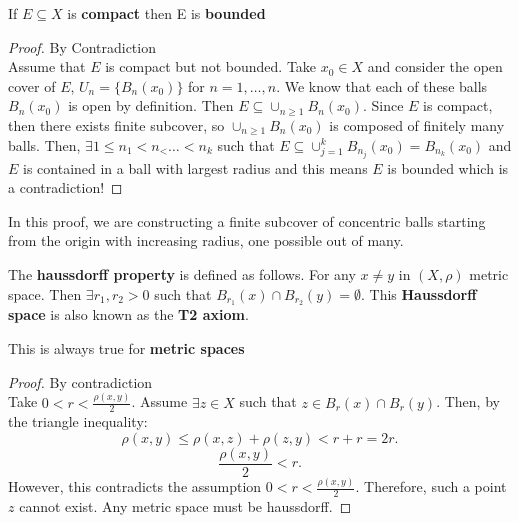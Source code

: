 \documentclass[a4paper]{article}
\begin{document}
\begin{prop}
  If $E \subseteq X$ is \textbf{compact} then E is \textbf{bounded}
  \begin{proof}{By Contradiction}\\
    Assume that $E$ is compact but not bounded.  Take $x_0 \in X$ and consider the open cover of $E$,  $U_n = \{ B_n(x_0) \}$ 
    for $n=1,\ldots,n$. We know that each of these balls $B_n(x_0)$ is open by definition. Then $E \subseteq \cup_{n \geq 1} B_n(x_0)$.
    Since $E$ is compact, then there exists finite subcover, so $\cup_{n \geq 1} B_n(x_0)$ is composed of finitely many balls.
    Then, $\exists 1 \leq n_1 < n_< \ldots < n_k$ such that $E \subseteq \cup_{j=1}^k B_{n_j}(x_0) = B_{n_k} (x_0)$ 
    and $E$ is contained in a ball with largest radius and this means $E$ is bounded which is a contradiction!  \end{proof}
\end{prop}
\begin{note} 
    In this proof, we are constructing a finite subcover of concentric balls starting from the origin with increasing radius,
    one possible out of many.
\end{note}

\begin{definition}
  The \textbf{haussdorff property} is defined as follows. For any $x \neq y$ in  $\left( X, \rho \right) $ metric space.
  Then $\exists r_1,r_2>0$ such that $B_{r_1}(x) \cap B_{r_2}(y) = \emptyset$. This \textbf{Haussdorff space} is also known
  as the \textbf{T2 axiom}.
\end{definition}
\begin{note}
  This is always true for \textbf{metric spaces}

  \begin{proof}{By contradiction} \\
    Take $0 < r < \frac{\rho(x,y)}{2}$. Assume $\exists z \in X$ such that $z \in B_r(x) \cap B_r(y)$.  Then,
    by the triangle inequality:
    \[
    \rho(x,y) \leq \rho(x,z) + \rho(z,y) < r + r = 2r 
    .\] 
    \[
    \frac{\rho(x,y)}{2} < r
    .\] 
    However, this contradicts the assumption $0 < r < \frac{\rho(x,y)}{2}$. Therefore, such a point $z$ 
    cannot exist. Any metric space must be haussdorff.
  \end{proof}
\end{note}
\end{document}

